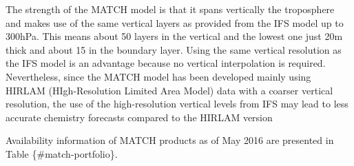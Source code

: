 \documentclass[9pt]{report}
\begin{document}
The strength of the MATCH model is that it spans vertically the troposphere and makes use of the same vertical layers as provided from the IFS model up to 300hPa. This means about 50 layers in the vertical and the lowest one just 20m thick and about 15 in the boundary layer. 
Using the same vertical resolution as the IFS model is an advantage because no vertical interpolation is required. 
Nevertheless, since the MATCH model has been developed mainly using HIRLAM (HIgh-Resolution Limited Area Model) data with a coarser vertical resolution, the use of the high-resolution vertical levels from IFS may lead to less accurate chemistry forecasts compared to the HIRLAM version%

Availability information of MATCH products as of May 2016 are presented in Table \{\#match-portfolio\}.%

\begin{table}[h!]%
\begin{mdcenter}%
{}%
\end{mdcenter}\label{match-portfolio}%
\end{table}%
\end{document}
